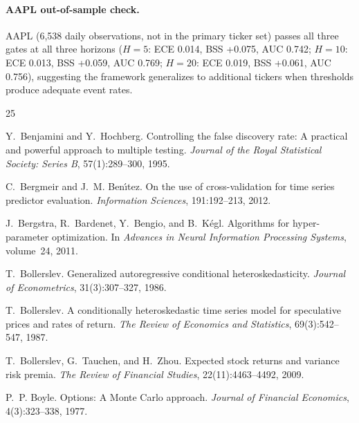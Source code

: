 \documentclass[11pt,a4paper]{article}
\begin{document}
\paragraph{AAPL out-of-sample check.}
AAPL (6,538 daily observations, not in the primary ticker set) passes all three gates at all three horizons ($H\!=\!5$: ECE 0.014, BSS +0.075, AUC 0.742; $H\!=\!10$: ECE 0.013, BSS +0.059, AUC 0.769; $H\!=\!20$: ECE 0.019, BSS +0.061, AUC 0.756), suggesting the framework generalizes to additional tickers when thresholds produce adequate event rates.

\begin{thebibliography}{25}

Y.~Benjamini and Y.~Hochberg.
\newblock Controlling the false discovery rate: A practical and powerful approach to multiple testing.
\newblock \emph{Journal of the Royal Statistical Society: Series B}, 57(1):289--300, 1995.

C.~Bergmeir and J.~M. Ben\'{\i}tez.
\newblock On the use of cross-validation for time series predictor evaluation.
\newblock \emph{Information Sciences}, 191:192--213, 2012.

J.~Bergstra, R.~Bardenet, Y.~Bengio, and B.~K\'{e}gl.
\newblock Algorithms for hyper-parameter optimization.
\newblock In \emph{Advances in Neural Information Processing Systems}, volume~24, 2011.

T.~Bollerslev.
\newblock Generalized autoregressive conditional heteroskedasticity.
\newblock \emph{Journal of Econometrics}, 31(3):307--327, 1986.

T.~Bollerslev.
\newblock A conditionally heteroskedastic time series model for speculative prices and rates of return.
\newblock \emph{The Review of Economics and Statistics}, 69(3):542--547, 1987.

T.~Bollerslev, G.~Tauchen, and H.~Zhou.
\newblock Expected stock returns and variance risk premia.
\newblock \emph{The Review of Financial Studies}, 22(11):4463--4492, 2009.

P.~P. Boyle.
\newblock Options: A {Monte Carlo} approach.
\newblock \emph{Journal of Financial Economics}, 4(3):323--338, 1977.


\end{thebibliography}
\end{document}

